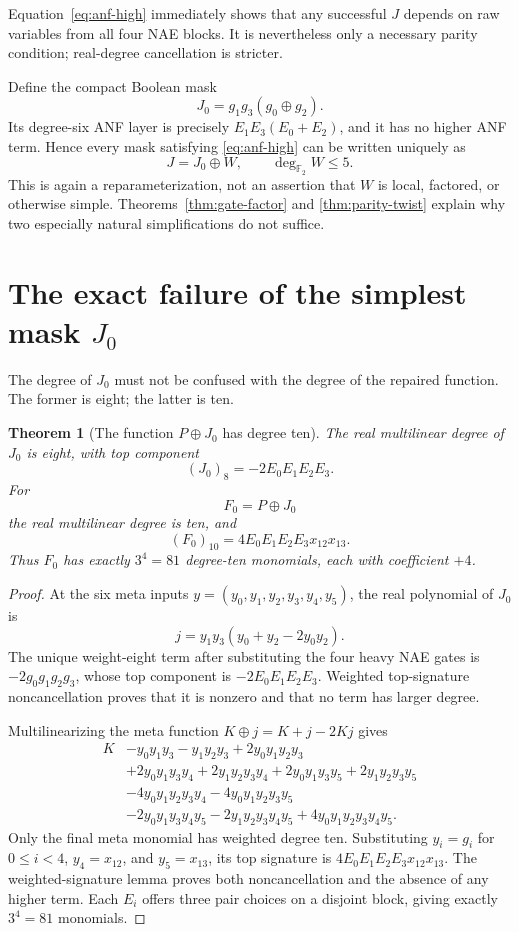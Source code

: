 \documentclass[11pt]{article}
\newtheorem{theorem}{Theorem}[section]
\theoremstyle{definition}
\newcommand{\Ftwo}{\mathbb F_2}
\begin{document}
Equation~\eqref{eq:anf-high} immediately shows that any successful \(J\)
depends on raw variables from all four NAE blocks.  It is nevertheless only a
necessary parity condition; real-degree cancellation is stricter.

Define the compact Boolean mask
\begin{equation}
 J_0=g_1g_3(g_0\oplus g_2).                               \label{eq:J0}
\end{equation}
Its degree-six ANF layer is precisely
\(E_1E_3(E_0+E_2)\), and it has no higher ANF term.  Hence every mask
satisfying \cref{eq:anf-high} can be written uniquely as
\[
 J=J_0\oplus W,
 \qquad \deg_{\Ftwo}W\le5.
\]
This is again a reparameterization, not an assertion that \(W\) is local,
factored, or otherwise simple.  Theorems~\ref{thm:gate-factor} and
\ref{thm:parity-twist} explain why two especially natural simplifications do
not suffice.

\section{The exact failure of the simplest mask \texorpdfstring{\(J_0\)}{J0}}
\label{sec:J0}

The degree of \(J_0\) must not be confused with the degree of the repaired
function.  The former is eight; the latter is ten.

\begin{theorem}[The function \(P\oplus J_0\) has degree ten]\label{thm:J0}
The real multilinear degree of \(J_0\) is eight, with top component
\[
 (J_0)_8=-2E_0E_1E_2E_3.
\]
For
\[
 F_0=P\oplus J_0
\]
the real multilinear degree is ten, and
\[
 (F_0)_{10}=4E_0E_1E_2E_3x_{12}x_{13}.
\]
Thus \(F_0\) has exactly \(3^4=81\) degree-ten monomials, each with
coefficient \(+4\).
\end{theorem}

\begin{proof}
At the six meta inputs \(y=(y_0,y_1,y_2,y_3,y_4,y_5)\), the real polynomial
of \(J_0\) is
\[
 j=y_1y_3(y_0+y_2-2y_0y_2).
\]
The unique weight-eight term after substituting the four heavy NAE gates is
\(-2g_0g_1g_2g_3\), whose top component is
\(-2E_0E_1E_2E_3\).  Weighted top-signature noncancellation proves that it is
nonzero and that no term has larger degree.

Multilinearizing the meta function \(K\oplus j=K+j-2Kj\) gives
\begin{align*}
 K
 &-y_0y_1y_3-y_1y_2y_3+2y_0y_1y_2y_3\\
 &+2y_0y_1y_3y_4+2y_1y_2y_3y_4
  +2y_0y_1y_3y_5+2y_1y_2y_3y_5\\
 &-4y_0y_1y_2y_3y_4-4y_0y_1y_2y_3y_5\\
 &-2y_0y_1y_3y_4y_5-2y_1y_2y_3y_4y_5
  +4y_0y_1y_2y_3y_4y_5.
\end{align*}
Only the final meta monomial has weighted degree ten.  Substituting
\(y_i=g_i\) for \(0\le i<4\), \(y_4=x_{12}\), and \(y_5=x_{13}\), its top
signature is
\(4E_0E_1E_2E_3x_{12}x_{13}\).  The weighted-signature lemma proves both
noncancellation and the absence of any higher term.  Each \(E_i\) offers three
pair choices on a disjoint block, giving exactly \(3^4=81\) monomials.
\end{proof}
\end{document}
